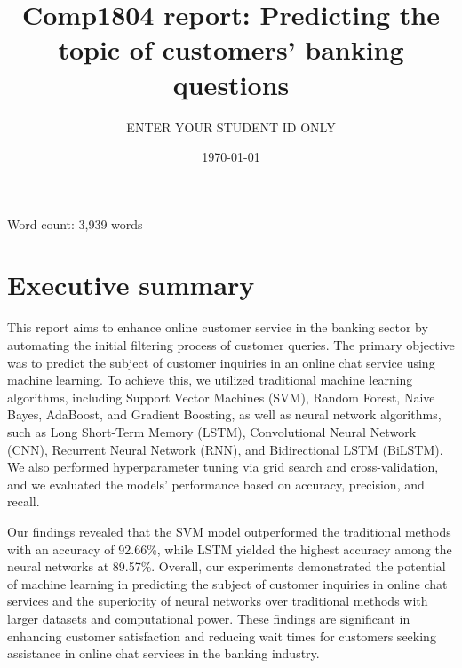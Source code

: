 \documentclass[12pt, a4paper]{article}
\title{Comp1804 report: Predicting the topic of customers’ banking questions}
\author{ENTER YOUR STUDENT ID ONLY }
\date{\today{}}
\begin{document}
\maketitle

Word count: 3,939 words  


\section*{Executive summary}
This report aims to enhance online customer service in the banking sector by automating the initial filtering process of customer queries. The primary objective was to predict the subject of customer inquiries in an online chat service using machine learning. \newline
To achieve this, we utilized traditional machine learning algorithms, including Support Vector Machines (SVM), Random Forest, Naive Bayes, AdaBoost, and Gradient Boosting, as well as neural network algorithms, such as Long Short-Term Memory (LSTM), Convolutional Neural Network (CNN), Recurrent Neural Network (RNN), and Bidirectional LSTM (BiLSTM). We also performed hyperparameter tuning via grid search and cross-validation, and we evaluated the models' performance based on accuracy, precision, and recall.

Our findings revealed that the SVM model outperformed the traditional methods with an accuracy of 92.66\%, while LSTM yielded the highest accuracy among the neural networks at 89.57\%. \newline
Overall, our experiments demonstrated the potential of machine learning in predicting the subject of customer inquiries in online chat services and the superiority of neural networks over traditional methods with larger datasets and computational power. These findings are significant in enhancing customer satisfaction and reducing wait times for customers seeking assistance in online chat services in the banking industry.
\end{document}
